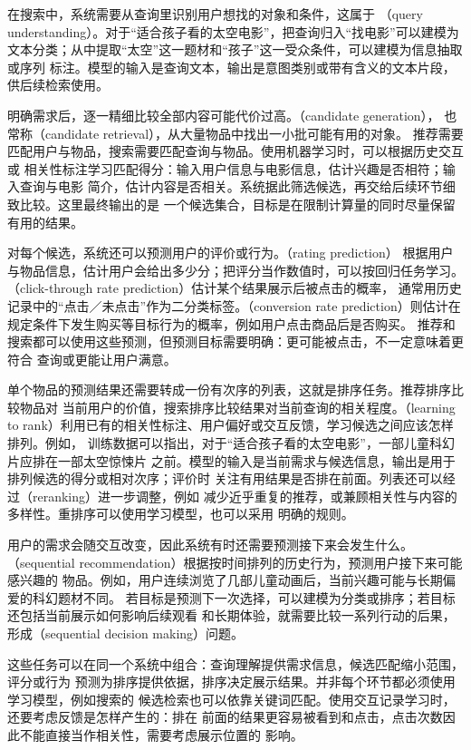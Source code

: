 在搜索中，系统需要从查询里识别用户想找的对象和条件，这属于
（query understanding）。对于“适合孩子看的太空电影”，把查询归入“找电影”可以建模为
文本分类；从中提取“太空”这一题材和“孩子”这一受众条件，可以建模为信息抽取或序列
标注。模型的输入是查询文本，输出是意图类别或带有含义的文本片段，供后续检索使用。

明确需求后，逐一精细比较全部内容可能代价过高。（candidate generation），
也常称（candidate retrieval），从大量物品中找出一小批可能有用的对象。
推荐需要匹配用户与物品，搜索需要匹配查询与物品。使用机器学习时，可以根据历史交互或
相关性标注学习匹配得分：输入用户信息与电影信息，估计兴趣是否相符；输入查询与电影
简介，估计内容是否相关。系统据此筛选候选，再交给后续环节细致比较。这里最终输出的是
一个候选集合，目标是在限制计算量的同时尽量保留有用的结果。

对每个候选，系统还可以预测用户的评价或行为。（rating prediction）
根据用户与物品信息，估计用户会给出多少分；把评分当作数值时，可以按回归任务学习。
（click-through rate prediction）估计某个结果展示后被点击的概率，
通常用历史记录中的“点击／未点击”作为二分类标签。（conversion rate
prediction）则估计在规定条件下发生购买等目标行为的概率，例如用户点击商品后是否购买。
推荐和搜索都可以使用这些预测，但预测目标需要明确：更可能被点击，不一定意味着更符合
查询或更能让用户满意。

单个物品的预测结果还需要转成一份有次序的列表，这就是排序任务。推荐排序比较物品对
当前用户的价值，搜索排序比较结果对当前查询的相关程度。（learning to
rank）利用已有的相关性标注、用户偏好或交互反馈，学习候选之间应该怎样排列。例如，
训练数据可以指出，对于“适合孩子看的太空电影”，一部儿童科幻片应排在一部太空惊悚片
之前。模型的输入是当前需求与候选信息，输出是用于排列候选的得分或相对次序；评价时
关注有用结果是否排在前面。列表还可以经过（reranking）进一步调整，例如
减少近乎重复的推荐，或兼顾相关性与内容的多样性。重排序可以使用学习模型，也可以采用
明确的规则。

用户的需求会随交互改变，因此系统有时还需要预测接下来会发生什么。
（sequential recommendation）根据按时间排列的历史行为，预测用户接下来可能感兴趣的
物品。例如，用户连续浏览了几部儿童动画后，当前兴趣可能与长期偏爱的科幻题材不同。
若目标是预测下一次选择，可以建模为分类或排序；若目标还包括当前展示如何影响后续观看
和长期体验，就需要比较一系列行动的后果，形成（sequential decision
making）问题。

这些任务可以在同一个系统中组合：查询理解提供需求信息，候选匹配缩小范围，评分或行为
预测为排序提供依据，排序决定展示结果。并非每个环节都必须使用学习模型，例如搜索的
候选检索也可以依靠关键词匹配。使用交互记录学习时，还要考虑反馈是怎样产生的：排在
前面的结果更容易被看到和点击，点击次数因此不能直接当作相关性，需要考虑展示位置的
影响。

